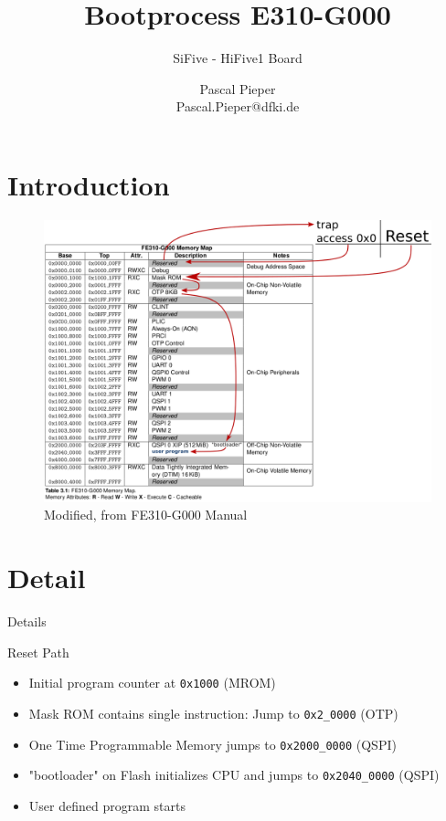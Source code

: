 \documentclass[aspectratio=169]{CPS-Beamer}
\title{Bootprocess E310-G000}
\subtitle{SiFive - HiFive1 Board}
\author[Pieper]{Pascal Pieper \\
{\tiny Pascal.Pieper@dfki.de}}
\institute[DFKI CPS]{DFKI GmbH, Cyber-Physical Systems \\ www.dfki.de/cps}
\begin{document}
\maketitle
\section{Introduction}
\begin{frame}[plain]
\begin{figure}
	\includegraphics[height=.95\textheight]{MemoryMap_ablauf.png}
	\caption{Modified, from FE310-G000 Manual}
\end{figure}
\end{frame}

\section{Detail}
\begin{frame}{Details}
	\begin{block}{Reset Path}
		\begin{itemize}
			\item Initial program counter at \texttt{0x1000} (MROM)
			\item Mask ROM contains single instruction: Jump to \texttt{0x2\_0000} (OTP)
			\item One Time Programmable Memory jumps to \texttt{0x2000\_0000} (QSPI)
			\item "bootloader" on Flash initializes CPU and jumps to \texttt{0x2040\_0000} (QSPI)
			\item User defined program starts
		\end{itemize}
	\end{block}
\end{frame}
\end{document}
